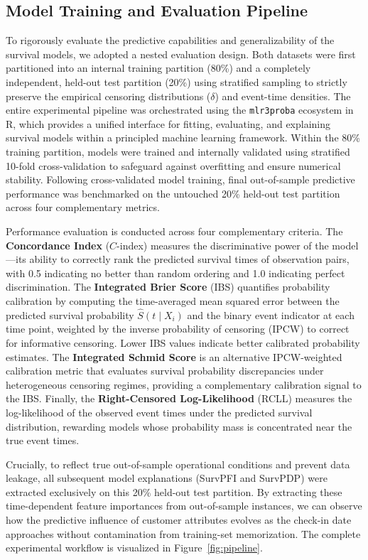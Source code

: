 \documentclass[pdflatex,sn-mathphys-ay]{sn-jnl}
\theoremstyle{thmstyleone}%
\theoremstyle{thmstyletwo}%
\theoremstyle{thmstylethree}%
\begin{document}
\subsection{Model Training and Evaluation Pipeline}
\label{sec:experiments}

To rigorously evaluate the predictive capabilities and generalizability of the survival models, we adopted a nested evaluation design. Both datasets were first partitioned into an internal training partition (80\%) and a completely independent, held-out test partition (20\%) using stratified sampling to strictly preserve the empirical censoring distributions ($\delta$) and event-time densities. The entire experimental pipeline was orchestrated using the \texttt{mlr3proba} ecosystem in R, which provides a unified interface for fitting, evaluating, and explaining survival models within a principled machine learning framework. Within the 80\% training partition, models were trained and internally validated using stratified 10-fold cross-validation to safeguard against overfitting and ensure numerical stability. Following cross-validated model training, final out-of-sample predictive performance was benchmarked on the untouched 20\% held-out test partition across four complementary metrics.

Performance evaluation is conducted across four complementary criteria. The \textbf{Concordance Index} ($C$-index) measures the discriminative power of the model—its ability to correctly rank the predicted survival times of observation pairs, with 0.5 indicating no better than random ordering and 1.0 indicating perfect discrimination. The \textbf{Integrated Brier Score} (IBS) quantifies probability calibration by computing the time-averaged mean squared error between the predicted survival probability $\hat{S}(t \mid X_i)$ and the binary event indicator at each time point, weighted by the inverse probability of censoring (IPCW) to correct for informative censoring. Lower IBS values indicate better calibrated probability estimates. The \textbf{Integrated Schmid Score} is an alternative IPCW-weighted calibration metric that evaluates survival probability discrepancies under heterogeneous censoring regimes, providing a complementary calibration signal to the IBS. Finally, the \textbf{Right-Censored Log-Likelihood} (RCLL) measures the log-likelihood of the observed event times under the predicted survival distribution, rewarding models whose probability mass is concentrated near the true event times.

Crucially, to reflect true out-of-sample operational conditions and prevent data leakage, all subsequent model explanations (SurvPFI and SurvPDP) were extracted exclusively on this 20\% held-out test partition. By extracting these time-dependent feature importances from out-of-sample instances, we can observe how the predictive influence of customer attributes evolves as the check-in date approaches without contamination from training-set memorization. The complete experimental workflow is visualized in Figure~\ref{fig:pipeline}.
\end{document}
